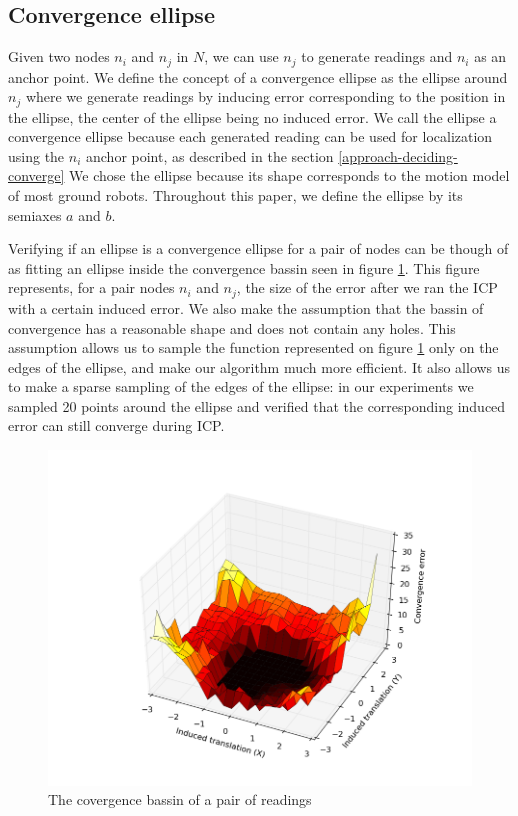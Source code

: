 \documentclass[letterpaper,10 pt,conference]{ieeeconf}
\begin{document}
\subsection{Convergence ellipse}
Given two nodes $n_i$ and $n_j$ in $N$, we can use $n_j$ to generate readings and $n_i$ as an anchor
point.  We define the concept of a convergence ellipse as the ellipse around $n_j$ where we generate
readings by inducing error corresponding to the position in the ellipse, the center of the ellipse
being no induced error. We call the ellipse a convergence ellipse because each generated reading can
be used for localization using the $n_i$ anchor point, as described in the section
\ref{approach-deciding-converge} We chose the ellipse because its shape corresponds to the motion
model of most ground robots. Throughout this paper, we define the ellipse by its semiaxes $a$ and $b$.

Verifying if an ellipse is a convergence ellipse for a pair of nodes can be though of as fitting an
ellipse inside the convergence bassin seen in figure \ref{convergence_bassin}. This figure
represents, for a pair nodes $n_i$ and $n_j$, the size of the error after we ran the ICP with a
certain induced error. We also make the assumption that the bassin of convergence has a reasonable
shape and does not contain any holes. This assumption allows us to sample the function represented
on figure \ref{convergence_bassin} only on the edges of the ellipse, and make our algorithm much
more efficient. It also allows us to make a sparse sampling of the edges of the ellipse: in
our experiments we sampled 20 points around the ellipse and verified that the corresponding induced
error can still converge during ICP.

\begin{figure}[thpb]
  \centering
  \includegraphics[scale=0.4]{convergence_bassin}
  \caption{The covergence bassin of a pair of readings}
  \label{convergence_bassin}
\end{figure}
\end{document}
